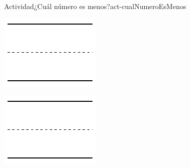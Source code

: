 \documentclass[20pt]{extarticle}
\begin{document}
\begin{activity}{Actividad}{¿Cuál número es menos?}{act-cualNumeroEsMenos}
\begin{sidebyside}{2}{0.1}{0.1}{0.2}
\begin{sbspanel}{0.3}
\includegraphics[max width=\linewidth, center]{external/svg-source/tikz-file-148545.pdf}
\end{sbspanel}%
\begin{sbspanel}{0.3}%
\includegraphics[max width=\linewidth, center]{external/svg-source/tikz-file-148545.pdf}
\end{sbspanel}%
\end{sidebyside}%
\end{activity}
\end{document}
